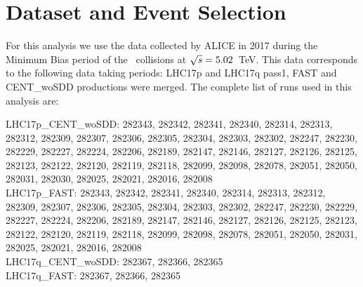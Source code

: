 %


\section{Dataset and Event Selection}

For this analysis we use the data collected by ALICE in 2017 during the Minimum Bias period of the \pp\ collisions at $\sqrt{s}=5.02$~TeV. This data corresponds to the following data taking periods:
LHC17p and LHC17q pass1, FAST and CENT\_woSDD productions were merged.
The complete list of runs used in this analysis are:

LHC17p\_CENT\_woSDD: 282343, 282342, 282341, 282340, 282314, 282313, 282312, 282309, 282307, 282306, 282305, 282304, 282303, 282302, 282247, 282230, 282229, 282227, 282224, 282206, 282189, 282147, 282146, 282127, 282126, 282125, 282123, 282122, 282120, 282119, 282118, 282099, 282098, 282078, 282051, 282050, 282031, 282030, 282025, 282021, 282016, 282008 \\
LHC17p\_FAST: 282343, 282342, 282341, 282340, 282314, 282313, 282312, 282309, 282307, 282306, 282305, 282304, 282303, 282302, 282247, 282230, 282229, 282227, 282224, 282206, 282189, 282147, 282146, 282127, 282126, 282125, 282123, 282122, 282120, 282119, 282118, 282099, 282098, 282078, 282051, 282050, 282031, 282025, 282021, 282016, 282008 \\
LHC17q\_CENT\_woSDD: 282367, 282366, 282365 \\
LHC17q\_FAST: 282367, 282366, 282365

